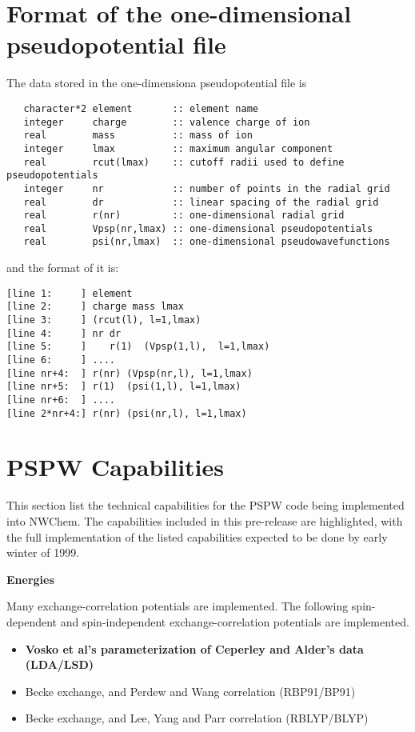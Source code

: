 \section{Format of the one-dimensional pseudopotential file}


The data stored in the one-dimensiona pseudopotential file is
\begin{verbatim}
   character*2 element       :: element name
   integer     charge        :: valence charge of ion
   real        mass          :: mass of ion
   integer     lmax          :: maximum angular component
   real        rcut(lmax)    :: cutoff radii used to define pseudopotentials
   integer     nr            :: number of points in the radial grid
   real        dr            :: linear spacing of the radial grid
   real        r(nr)         :: one-dimensional radial grid
   real        Vpsp(nr,lmax) :: one-dimensional pseudopotentials
   real        psi(nr,lmax)  :: one-dimensional pseudowavefunctions
\end{verbatim}
and the format of it is:
\begin{verbatim}
[line 1:     ] element	
[line 2:     ] charge mass lmax
[line 3:     ] (rcut(l), l=1,lmax)
[line 4:     ] nr dr
[line 5:     ]    r(1)  (Vpsp(1,l),  l=1,lmax)
[line 6:     ] ....
[line nr+4:  ] r(nr) (Vpsp(nr,l), l=1,lmax)
[line nr+5:  ] r(1)  (psi(1,l), l=1,lmax) 
[line nr+6:  ] ....
[line 2*nr+4:] r(nr) (psi(nr,l), l=1,lmax)
\end{verbatim}


\section{PSPW Capabilities}

This section list the technical capabilities for the PSPW code being 
implemented into NWChem.  The capabilities included in this pre-release
are highlighted, with the full implementation of the listed capabilities 
expected to be done by early winter of 1999.

\large
\textbf{Energies}
\normalsize

Many exchange-correlation potentials are implemented.
The following spin-dependent and spin-independent exchange-correlation
potentials are implemented.
\begin{itemize}
	\item \textbf{Vosko et al's parameterization of Ceperley and 
	       Alder's data (LDA/LSD)}
	\item Becke exchange, and Perdew and Wang correlation (RBP91/BP91)
	\item Becke exchange, and Lee, Yang and Parr correlation (RBLYP/BLYP)
\end{itemize} 

